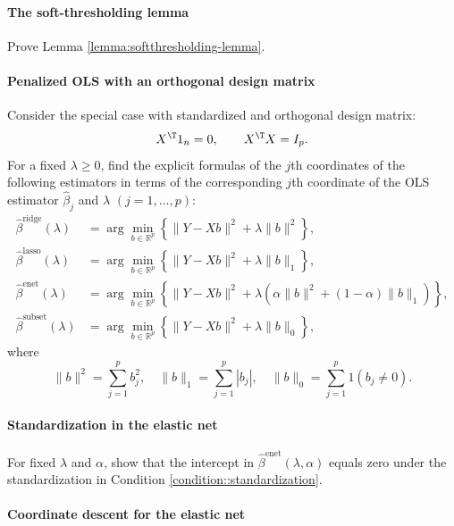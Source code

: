 \paragraph{The soft-thresholding lemma}\label{hw14::soft-thresholding-lemma}

Prove Lemma \ref{lemma:softthresholding-lemma}. 

\paragraph{Penalized OLS with an orthogonal design matrix}\label{hw14::orthogonal-ols-pen}

Consider the special case with standardized and orthogonal design
matrix:
\[
X^{\T}1_{n}=0,\qquad X^{\T}X=I_{p}.
\]
For a fixed $\lambda\geq0$, find the explicit formulas of the $j$th coordinates of the following
estimators in terms of the corresponding $j$th coordinate of the OLS estimator $\hat{\beta}_j$ and
$\lambda$ $(j=1,\ldots, p)$:
\begin{align*}
\hat{\beta}^{\text{ridge}}(\lambda) & =\arg\min_{b\in\mathbb{R}^{p}}\left\{ \|Y-Xb\|^{2}+\lambda\|b\|^{2}\right\} ,\\
\hat{\beta}^{\text{lasso}}(\lambda) & =\arg\min_{b\in\mathbb{R}^{p}}\left\{ \|Y-Xb\|^{2}+\lambda\|b\|_{1}\right\} ,\\
\hat{\beta}^{\text{enet}}(\lambda) & =\arg\min_{b\in\mathbb{R}^{p}}\left\{ \|Y-Xb\|^{2}+\lambda  (  \alpha \|b\|^{2} + (1-\alpha) \|b\|_{1} )  \right\}  ,\\
\hat{\beta}^{\text{subset}}(\lambda) & =\arg\min_{b\in\mathbb{R}^{p}}\left\{ \|Y-Xb\|^{2}+\lambda\|b\|_{0}\right\} ,
\end{align*}
where 
\[
 \|b\|^2 =  \sum_{j=1}^{p}b_{j}^{2},\quad\|b\|_{1}=\sum_{j=1}^{p}|b_{j}|,\quad\|b\|_{0}=\sum_{j=1}^{p}1(b_{j}\neq0).
\]


\paragraph{Standardization in the elastic net}\label{hw14::standardization-enet}


For fixed $\lambda$ and $\alpha$, show that the intercept in 
$
\hat{\beta}^{\text{enet}}(\lambda,\alpha)
$
equals zero under the standardization in Condition \ref{condition::standardization}. 


\paragraph{Coordinate descent for the elastic net}\label{hw14::enet-coordinate-descent}

